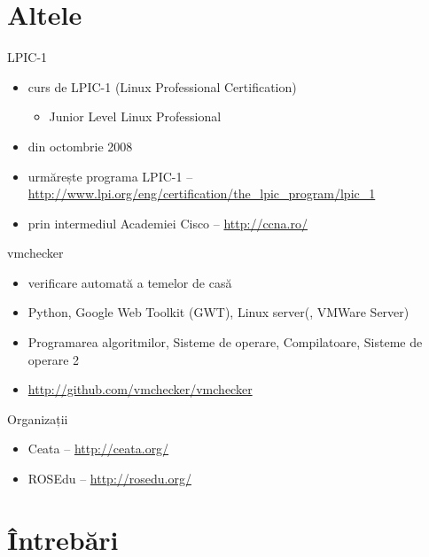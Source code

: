 \documentclass{simple}
\begin{document}
\section{Altele}

\frame{\tableofcontents[currentsection]}

\begin{frame}{LPIC-1}
	\begin{itemize}
		\item curs de LPIC-1 (Linux Professional Certification)
			\begin{itemize}
				\item Junior Level Linux Professional
			\end{itemize}
		\item din octombrie 2008
		\item urmărește programa LPIC-1 --
		\url{http://www.lpi.org/eng/certification/the_lpic_program/lpic_1}
		\item prin intermediul Academiei Cisco -- \url{http://ccna.ro/}
	\end{itemize}
\end{frame}

\begin{frame}{vmchecker}
	\begin{itemize}
		\item verificare automată a temelor de casă
		\item Python, Google Web Toolkit (GWT), Linux server(, VMWare Server)
		\item Programarea algoritmilor, Sisteme de operare, Compilatoare,
		Sisteme de operare 2
		\item \url{http://github.com/vmchecker/vmchecker}
	\end{itemize}
\end{frame}

\begin{frame}{Organizații}
	\begin{itemize}
		\item Ceata -- \url{http://ceata.org/}
		\item ROSEdu -- \url{http://rosedu.org/}
	\end{itemize}
\end{frame}

\section{Întrebări}

\frame{\tableofcontents[currentsection]}
\end{document}
